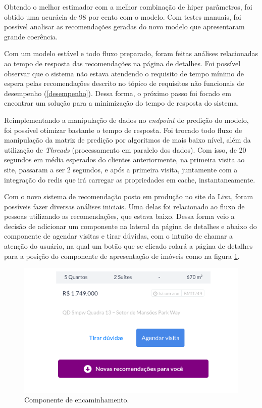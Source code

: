 Obtendo o melhor estimador com a melhor combinação de hiper parâmetros, foi obtido uma acurácia de 98 por cento com o modelo. Com testes manuais, foi possível analisar as recomendações geradas do novo modelo que apresentaram grande coerência.

Com um modelo estável e todo fluxo preparado, foram feitas análises relacionadas ao tempo de resposta das recomendações na página de detalhes. Foi possível observar que o sistema não estava atendendo o requisito de tempo mínimo de espera pelas recomendações descrito no tópico de requisitos não funcionais de desempenho (\ref{desempenho}). Dessa forma, o próximo passo foi focado em encontrar um solução para a minimização do tempo de resposta do sistema.

Reimplementando a manipulação de dados no \textit{endpoint} de predição do modelo, foi possível otimizar bastante o tempo de resposta. Foi trocado todo fluxo de manipulação da matriz de predição por algoritmos de mais baixo nível, além da utilização de \textit{Threads} (processamento em paralelo dos dados). Com isso, de 20 segundos em média esperados do clientes anteriormente, na primeira visita ao site, passaram a ser 2 segundos, e após a primeira visita, juntamente com a integração do redis que irá carregar as propriedades em cache, instantaneamente.

Com o novo sistema de recomendação posto em produção no site da Liva, foram possíveis fazer diversas análises iniciais. Uma delas foi relacionado ao fluxo de pessoas utilizando as recomendações, que estava baixo. Dessa forma veio a decisão de adicionar um componente na lateral da página de detalhes e abaixo do componente de agendar visitas e tirar dúvidas, com o intuito de chamar a atenção do usuário, na qual um botão que se clicado rolará a página de detalhes para a posição do componente de apresentação de imóveis como na figura \ref{fig:componente_scroll}.

\begin{figure}[H]
    \centering
    \includegraphics[scale=0.6]{figuras/desenvolvimento/componente_scroll.png}
    \caption[Componente de encaminhamento]{Componente de encaminhamento.}
    \label{fig:componente_scroll}
\end{figure}


